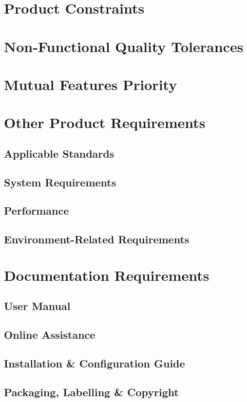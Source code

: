 \documentclass[12pt,a4paper,oneside, titlepage]{article}
\begin{document}
    \newpage
	\section{Product Constraints}
	
    \newpage
	\section{Non-Functional Quality Tolerances}
	
	\newpage
	\section{Mutual Features Priority}
	
    \newpage
	\section{Other Product Requirements}
	\subsection{Applicable Standards}
	\subsection{System Requirements}
	\subsection{Performance}
	\subsection{Environment-Related Requirements}

    \newpage
	\section{Documentation Requirements}
	\subsection{User Manual}
	\subsection{Online Assistance}
	\subsection{Installation \& Configuration Guide}
	\subsection{Packaging, Labelling \& Copyright}
    \newpage
    {}
    
\end{document}
